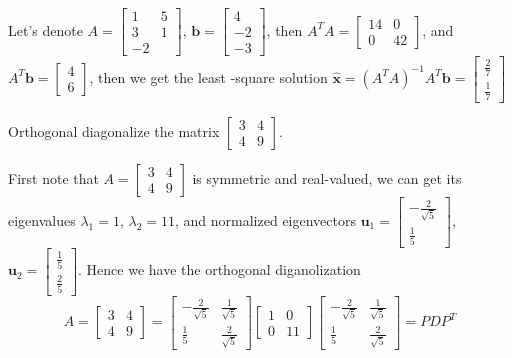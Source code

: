 \documentclass[a4paper,10pt]{article}
\begin{document}
\begin{solution}
Let's denote $A=\begin{bmatrix}
1&5\\
3&1\\
-2&
\end{bmatrix}$, $\mathbf b=\begin{bmatrix}
4\\-2\\-3
\end{bmatrix}$, then $A^TA=\begin{bmatrix}
14&0\\
0&42
\end{bmatrix}$, and $A^T\mathbf b=\begin{bmatrix}
4\\6
\end{bmatrix}$, then we get the least -square solution $\hat{\mathbf x}=(A^TA)^{-1}A^T\mathbf b=\begin{bmatrix}
\frac{2}{7}\\\frac{1}{7}
\end{bmatrix}$
\end{solution}

\begin{problem}
Orthogonal diagonalize the matrix $\begin{bmatrix}
3&4\\
4&9
\end{bmatrix}$.
\end{problem}

\begin{solution}
First note that $A=\begin{bmatrix}
3&4\\
4&9
\end{bmatrix}$ is symmetric and real-valued, we can get its eigenvalues $\lambda_1=1$, $\lambda_2=11$, and normalized eigenvectors $\mathbf u_1=\begin{bmatrix}
-\frac{2}{\sqrt5}\\\frac{1}{5}
\end{bmatrix}$, $\mathbf u_2=\begin{bmatrix}
\frac{1}{5}\\\frac{2}{5}
\end{bmatrix}$. Hence we have the orthogonal diganolization
\[
A=\begin{bmatrix}
3&4\\
4&9
\end{bmatrix}=\begin{bmatrix}
-\frac{2}{\sqrt5}&\frac{1}{\sqrt5}\\
\frac{1}{5}&\frac{2}{\sqrt5}
\end{bmatrix}\begin{bmatrix}
1&0\\0&11
\end{bmatrix}\begin{bmatrix}
-\frac{2}{\sqrt5}&\frac{1}{\sqrt5}\\
\frac{1}{5}&\frac{2}{\sqrt5}
\end{bmatrix}=PDP^T
\]
\end{solution}
\end{document}

